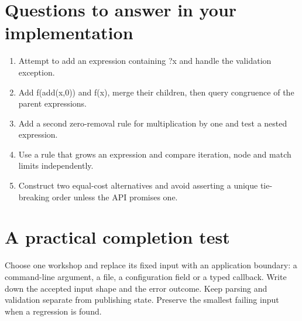 \section*{Questions to answer in your implementation}
\begin{enumerate}
\item Attempt to add an expression containing ?x and handle the validation exception.
\item Add f(add(x,0)) and f(x), merge their children, then query congruence of the parent expressions.
\item Add a second zero-removal rule for multiplication by one and test a nested expression.
\item Use a rule that grows an expression and compare iteration, node and match limits independently.
\item Construct two equal-cost alternatives and avoid asserting a unique tie-breaking order unless the API promises one.
\end{enumerate}
\section*{A practical completion test}
Choose one workshop and replace its fixed input with an application boundary: a command-line argument, a file, a configuration field or a typed callback. Write down the accepted input shape and the error outcome. Keep parsing and validation separate from publishing state. Preserve the smallest failing input when a regression is found.


